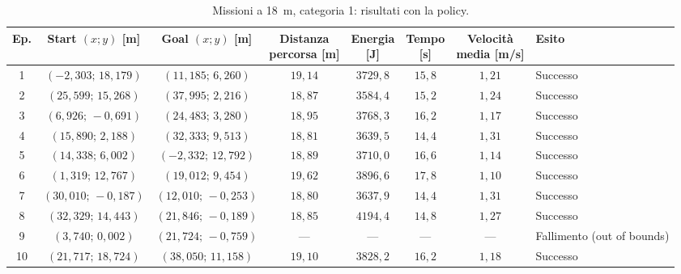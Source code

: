 \begin{table}[H]
\centering
\caption{Missioni a 18~m, categoria 1: risultati con la policy.}
\label{tab:big-map-18m-cat1}
\begingroup
\fontsize{9}{11}\selectfont
\setlength{\tabcolsep}{2.5pt}
\renewcommand{\arraystretch}{1.2}
\begin{tabular}{@{}c cc cccc l@{}}
\toprule
Ep. & \shortstack{Start $(x;y)$\\{}[m]} & \shortstack{Goal $(x;y)$\\{}[m]} & \shortstack{Distanza\\percorsa [m]} & \shortstack{Energia\\{}[J]} & \shortstack{Tempo\\{}[s]} & \shortstack{Velocità\\media [m/s]} & Esito \\
\midrule
1 & $(-2{,}303;\,18{,}179)$ & $(11{,}185;\,6{,}260)$ & $19{,}14$ & $3729{,}8$ & $15{,}8$ & $1{,}21$ & Successo \\
2 & $(25{,}599;\,15{,}268)$ & $(37{,}995;\,2{,}216)$ & $18{,}87$ & $3584{,}4$ & $15{,}2$ & $1{,}24$ & Successo \\
3 & $(6{,}926;\,-0{,}691)$ & $(24{,}483;\,3{,}280)$ & $18{,}95$ & $3768{,}3$ & $16{,}2$ & $1{,}17$ & Successo \\
4 & $(15{,}890;\,2{,}188)$ & $(32{,}333;\,9{,}513)$ & $18{,}81$ & $3639{,}5$ & $14{,}4$ & $1{,}31$ & Successo \\
5 & $(14{,}338;\,6{,}002)$ & $(-2{,}332;\,12{,}792)$ & $18{,}89$ & $3710{,}0$ & $16{,}6$ & $1{,}14$ & Successo \\
6 & $(1{,}319;\,12{,}767)$ & $(19{,}012;\,9{,}454)$ & $19{,}62$ & $3896{,}6$ & $17{,}8$ & $1{,}10$ & Successo \\
7 & $(30{,}010;\,-0{,}187)$ & $(12{,}010;\,-0{,}253)$ & $18{,}80$ & $3637{,}9$ & $14{,}4$ & $1{,}31$ & Successo \\
8 & $(32{,}329;\,14{,}443)$ & $(21{,}846;\,-0{,}189)$ & $18{,}85$ & $4194{,}4$ & $14{,}8$ & $1{,}27$ & Successo \\
9 & $(3{,}740;\,0{,}002)$ & $(21{,}724;\,-0{,}759)$ & --- & --- & --- & --- & Fallimento (out of bounds) \\
10 & $(21{,}717;\,18{,}724)$ & $(38{,}050;\,11{,}158)$ & $19{,}10$ & $3828{,}2$ & $16{,}2$ & $1{,}18$ & Successo \\
\bottomrule
\end{tabular}
\endgroup
\end{table}

